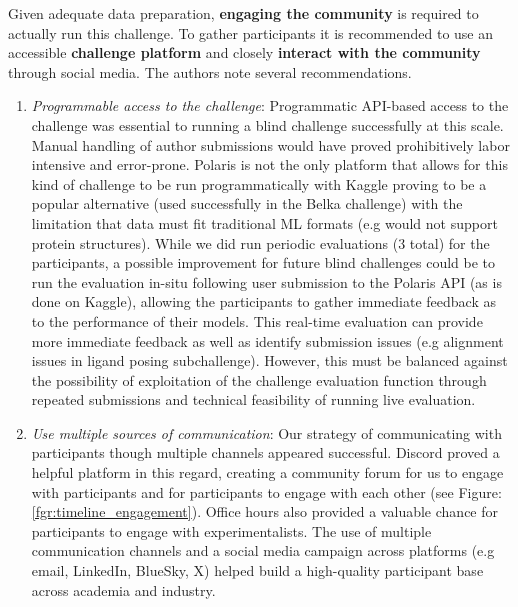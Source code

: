 \documentclass[journal=jcim,manuscript=article]{achemso}
\begin{document}
Given adequate data preparation, \textbf{engaging the community} is required to actually run this challenge. To gather participants it is recommended to use an accessible \textbf{challenge platform} and closely \textbf{interact with the community} through social media. The authors note several recommendations.
\begin{enumerate}
    \item \textit{Programmable access to the challenge}: Programmatic API-based access to the challenge was essential to running a blind challenge successfully at this scale. Manual handling of author submissions would have proved prohibitively labor intensive and error-prone. Polaris is not the only platform that allows for this kind of challenge to be run programmatically with Kaggle proving to be a popular alternative (used successfully in the Belka challenge\cite{quigley2024belka}) with the limitation that data must fit traditional ML formats (e.g would not support protein structures). While we did run periodic evaluations (3 total) for the participants, a possible improvement for future blind challenges could be to run the evaluation in-situ following user submission to the Polaris API (as is done on Kaggle), allowing the participants to gather immediate feedback as to the performance of their models. This real-time evaluation can provide more immediate feedback as well as identify submission issues (e.g alignment issues in ligand posing subchallenge). However, this must be balanced against the possibility of exploitation of the challenge evaluation function through repeated submissions and technical feasibility of running live evaluation.
    \item \textit{Use multiple sources of communication}: Our strategy of communicating with participants though multiple channels appeared successful. Discord proved a helpful platform in this regard, creating a community forum for us to engage with participants and for participants to engage with each other (see Figure: \ref{fgr:timeline_engagement}). Office hours also provided a valuable chance for participants to engage with experimentalists. The use of multiple communication channels and a social media campaign across platforms (e.g email, LinkedIn, BlueSky, X) helped build a high-quality participant base across academia and industry.
    

\end{enumerate}
\end{document}
